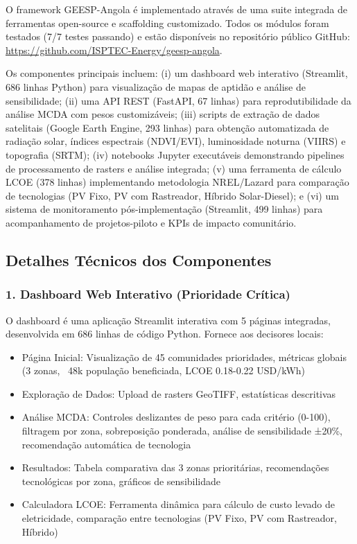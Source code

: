 \documentclass[12pt, a4paper]{article}
\begin{document}
{{{{{{{{{{{{O framework GEESP-Angola é implementado através de uma suite integrada de ferramentas open-source e scaffolding customizado. Todos os módulos foram testados (7/7 testes passando) e estão disponíveis no repositório público GitHub: \url{https://github.com/ISPTEC-Energy/geesp-angola}.

Os componentes principais incluem: (i) um dashboard web interativo (Streamlit, 686 linhas Python) para visualização de mapas de aptidão e  análise de sensibilidade; (ii) uma API REST (FastAPI, 67 linhas) para reprodutibilidade da análise MCDA com pesos customizáveis; (iii) scripts de extração de dados satelitais (Google Earth Engine, 293 linhas) para obtenção automatizada de radiação solar, índices espectrais (NDVI/EVI), luminosidade noturna (VIIRS) e topografia (SRTM); (iv) notebooks Jupyter executáveis demonstrando pipelines de processamento de rasters e análise integrada; (v) uma ferramenta de cálculo LCOE (378 linhas) implementando metodologia NREL/Lazard para comparação de tecnologias (PV Fixo, PV com Rastreador, Híbrido Solar-Diesel); e (vi) um sistema de monitoramento pós-implementação (Streamlit, 499 linhas) para acompanhamento de projetos-piloto e KPIs de impacto comunitário.

\subsection{Detalhes Técnicos dos Componentes}

\subsubsection{1. Dashboard Web Interativo (Prioridade Crítica)}

O dashboard é uma aplicação Streamlit interativa com 5 páginas integradas, desenvolvida em 686 linhas de código Python. Fornece aos decisores locais:

\begin{itemize}
    \item Página Inicial: Visualização de 45 comunidades prioridades, métricas globais (3 zonas, ~48k população beneficiada, LCOE 0.18-0.22 USD/kWh)
    \item Exploração de Dados: Upload de rasters GeoTIFF, estatísticas descritivas
    \item Análise MCDA: Controles deslizantes de peso para cada critério (0-100), filtragem por zona, sobreposição ponderada, análise de sensibilidade ±20\%, recomendação automática de tecnologia
    \item Resultados: Tabela comparativa das 3 zonas prioritárias, recomendações tecnológicas por zona, gráficos de sensibilidade
    \item Calculadora LCOE: Ferramenta dinâmica para cálculo de custo levado de eletricidade, comparação entre tecnologias (PV Fixo, PV com Rastreador, Híbrido)
\end{itemize}

}}}}}}}}}}}}
\end{document}
